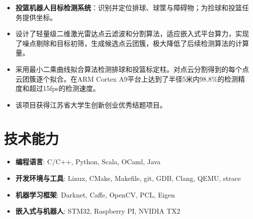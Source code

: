 \documentclass{resume}
\begin{document}
\begin{itemize}
  \item \textbf{投篮机器人目标检测系统}：识别并定位排球、球筐与障碍物；为捡球和投篮任务提供坐标。
  \item 设计了轻量级二维激光雷达点云滤波和分割算法，适应嵌入式平台算力，实现了噪点剔除和目标初筛，生成候选点云团簇，极大降低了后续检测算法的计算量。
  \item 采用最小二乘曲线拟合算法检测排球和投篮标定柱。对点云分割得到的每个点云团簇逐个拟合。在ARM Cortex A9平台上达到了半径5米内98.8\%的检测精度和超过15fps的检测速度。
  \item 该项目获得江苏省大学生创新创业优秀结题项目。
\end{itemize}

\section{技术能力}
\begin{itemize}[parsep=0.2ex]
  \item \textbf{编程语言}: C/C++, Python, Scala, OCaml, Java
  \item \textbf{开发环境与工具}: Linux, CMake, Makefile, git, GDB, Clang, QEMU, strace
  \item \textbf{机器学习框架}: Darknet, Caffe, OpenCV, PCL, Eigen
  \item \textbf{嵌入式与机器人}: STM32, Raspberry PI, NVIDIA TX2
\end{itemize}
\end{document}
